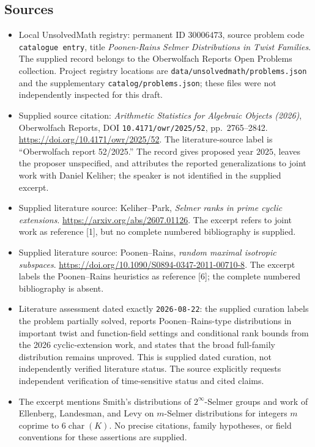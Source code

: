 \documentclass[11pt]{article}
\begin{document}
\subsection{Sources}
\begin{itemize}
\item Local UnsolvedMath registry: permanent ID \(30006473\), source problem code \texttt{catalogue entry}, title \emph{Poonen-Rains Selmer Distributions in Twist Families}. The supplied record belongs to the Oberwolfach Reports Open Problems collection. Project registry locations are \texttt{data/unsolvedmath/problems.json} and the supplementary \texttt{catalog/problems.json}; these files were not independently inspected for this draft.
\item Supplied source citation: \emph{Arithmetic Statistics for Algebraic Objects (2026)}, Oberwolfach Reports, DOI \texttt{10.4171/owr/2025/52}, pp.~2765--2842. \url{https://doi.org/10.4171/owr/2025/52}. The literature-source label is ``Oberwolfach report 52/2025.'' The record gives proposed year \(2025\), leaves the proposer unspecified, and attributes the reported generalizations to joint work with Daniel Keliher; the speaker is not identified in the supplied excerpt.
\item Supplied literature source: Keliher--Park, \emph{Selmer ranks in prime cyclic extensions}. \url{https://arxiv.org/abs/2607.01126}. The excerpt refers to joint work as reference [1], but no complete numbered bibliography is supplied.
\item Supplied literature source: Poonen--Rains, \emph{random maximal isotropic subspaces}. \url{https://doi.org/10.1090/S0894-0347-2011-00710-8}. The excerpt labels the Poonen--Rains heuristics as reference [6]; the complete numbered bibliography is absent.
\item Literature assessment dated exactly \texttt{2026-08-22}: the supplied curation labels the problem partially solved, reports Poonen--Rains-type distributions in important twist and function-field settings and conditional rank bounds from the 2026 cyclic-extension work, and states that the broad full-family distribution remains unproved. This is supplied dated curation, not independently verified literature status. The source explicitly requests independent verification of time-sensitive status and cited claims.
\item The excerpt mentions Smith's distributions of \(2^\infty\)-Selmer groups and work of Ellenberg, Landesman, and Levy on \(m\)-Selmer distributions for integers \(m\) coprime to \(6\operatorname{char}(K)\). No precise citations, family hypotheses, or field conventions for these assertions are supplied.
\end{itemize}
\end{document}
